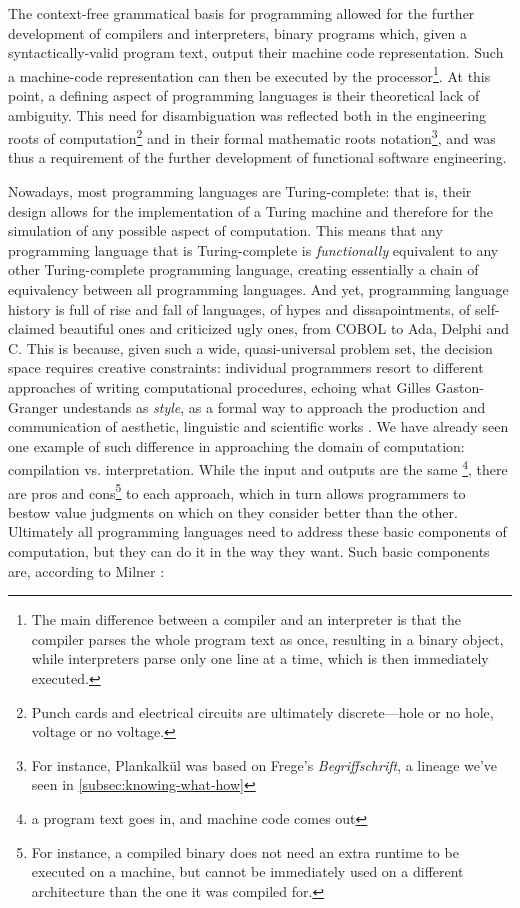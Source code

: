 The context-free grammatical basis for programming allowed for the further development of compilers and interpreters, binary programs which, given a syntactically-valid program text, output their machine code representation. Such a machine-code representation can then be executed by the processor\footnote{The main difference between a compiler and an interpreter is that the compiler parses the whole program text as once, resulting in a binary object, while interpreters parse only one line at a time, which is then immediately executed.}. At this point, a defining aspect of programming languages is their theoretical lack of ambiguity. This need for disambiguation was reflected both in the engineering roots of computation\footnote{Punch cards and electrical circuits are ultimately discrete—hole or no hole, voltage or no voltage.} and in their formal mathematic roots notation\footnote{For instance, Plankalkül was based on Frege's \emph{Begriffschrift}, a lineage we've seen in \ref{subsec:knowing-what-how}}, and was thus a requirement of the further development of functional software engineering.

Nowadays, most programming languages are Turing-complete: that is, their design allows for the implementation of a Turing machine and therefore for the simulation of any possible aspect of computation. This means that any programming language that is Turing-complete is \emph{functionally} equivalent to any other Turing-complete programming language, creating essentially a chain of equivalency between all programming languages. And yet, programming language history is full of rise and fall of languages, of hypes and dissapointments, of self-claimed beautiful ones and criticized ugly ones, from COBOL to Ada, Delphi and C. This is because, given such a wide, quasi-universal problem set, the decision space requires creative constraints: individual programmers resort to different approaches of writing computational procedures, echoing what Gilles Gaston-Granger undestands as \emph{style}, as a formal way to approach the production and communication of aesthetic, linguistic and scientific works \citep{granger_essai_1988}. We have already seen one example of such difference in approaching the domain of computation: compilation vs. interpretation. While the input and outputs are the same \footnote{a program text goes in, and machine code comes out}, there are pros and cons\footnote{For instance, a compiled binary does not need an extra runtime to be executed on a machine, but cannot be immediately used on a different architecture than the one it was compiled for.} to each approach, which in turn allows programmers to bestow value judgments on which on they consider better than the other. Ultimately all programming languages need to address these basic components of computation, but they can do it in the way they want. Such basic components are, according to Milner \citep{milner_semantic_1996}:

